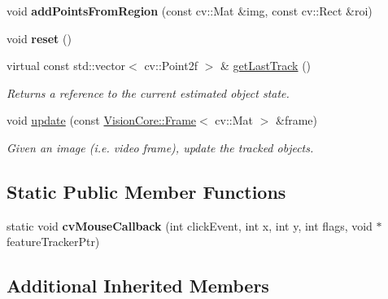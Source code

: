 \begin{DoxyCompactItemize}
\item 
\hypertarget{class_viscv_1_1_feature_tracker_k_l_t_cv_ae54e239708d4ea24db455a2e1f88d086}{}void {\bfseries add\+Points\+From\+Region} (const cv\+::\+Mat \&img, const cv\+::\+Rect \&roi)\label{class_viscv_1_1_feature_tracker_k_l_t_cv_ae54e239708d4ea24db455a2e1f88d086}

\item 
\hypertarget{class_viscv_1_1_feature_tracker_k_l_t_cv_ad20897c5c8bd47f5d4005989bead0e55}{}void {\bfseries reset} ()\label{class_viscv_1_1_feature_tracker_k_l_t_cv_ad20897c5c8bd47f5d4005989bead0e55}

\item 
virtual const std\+::vector$<$ cv\+::\+Point2f $>$ \& \hyperlink{class_viscv_1_1_feature_tracker_k_l_t_cv_af54d7c5518cd3377ba19514359d51ca7}{get\+Last\+Track} ()
\begin{DoxyCompactList}\small\item\em Returns a reference to the current estimated object state. \end{DoxyCompactList}\item 
\hypertarget{class_viscv_1_1_feature_tracker_k_l_t_cv_ab233da15b6c7aad7d83c67057a558bd4}{}void \hyperlink{class_viscv_1_1_feature_tracker_k_l_t_cv_ab233da15b6c7aad7d83c67057a558bd4}{update} (const \hyperlink{struct_vision_core_1_1_data_structures_1_1_frame}{Vision\+Core\+::\+Frame}$<$ cv\+::\+Mat $>$ \&frame)\label{class_viscv_1_1_feature_tracker_k_l_t_cv_ab233da15b6c7aad7d83c67057a558bd4}

\begin{DoxyCompactList}\small\item\em Given an image (i.\+e. video frame), update the tracked objects. \end{DoxyCompactList}\end{DoxyCompactItemize}
\subsection*{Static Public Member Functions}
\begin{DoxyCompactItemize}
\item 
\hypertarget{class_viscv_1_1_feature_tracker_k_l_t_cv_a272ed08f7c5f71f877cade1838cbc513}{}static void {\bfseries cv\+Mouse\+Callback} (int click\+Event, int x, int y, int flags, void $\ast$feature\+Tracker\+Ptr)\label{class_viscv_1_1_feature_tracker_k_l_t_cv_a272ed08f7c5f71f877cade1838cbc513}

\end{DoxyCompactItemize}
\subsection*{Additional Inherited Members}



